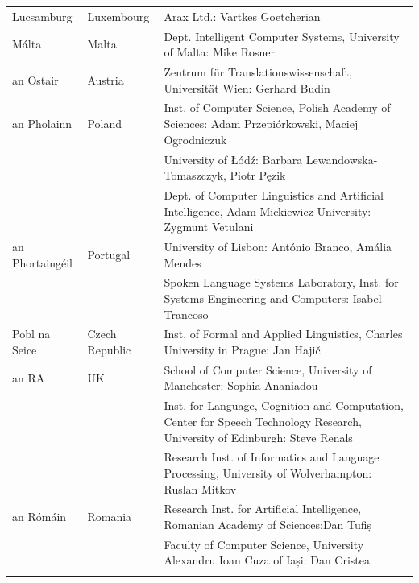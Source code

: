 \begin{longtable}{@{}llp{113mm}@{}}
  Lucsamburg & \textcolor{grey1}{Luxembourg} & Arax Ltd.: Vartkes Goetcherian\\ \addlinespace
  
  Málta & \textcolor{grey1}{Malta} & Dept. Intelligent Computer Systems, University of Malta: Mike Rosner\\ \addlinespace
  
  an Ostair & \textcolor{grey1}{Austria} & Zentrum für Translationswissenschaft, Universität Wien: Gerhard Budin\\ \addlinespace
   
  an Pholainn & \textcolor{grey1}{Poland} & Inst. of Computer Science, Polish Academy of Sciences: Adam Przepiórkowski, Maciej Ogrodniczuk \\ \addlinespace
  & & University of Łódź: Barbara Lewandowska-Tomaszczyk, Piotr Pęzik\\ \addlinespace
  & & Dept. of Computer Linguistics and Artificial Intelligence, Adam Mickiewicz University: Zygmunt Vetulani \\ \addlinespace
  
  an Phortaingéil & \textcolor{grey1}{Portugal} & University of Lisbon: António Branco, Amália Mendes \\ \addlinespace
  & & Spoken Language Systems Laboratory, Inst. for Systems Engineering and Computers: Isabel Trancoso \\ \addlinespace
  
  Pobl na Seice & \textcolor{grey1}{Czech Republic} & Inst. of Formal and Applied Linguistics, Charles University in Prague: Jan Hajič \\ \addlinespace
  
  an RA & \textcolor{grey1}{UK} &   School of Computer Science, University of Manchester: Sophia Ananiadou \\ \addlinespace 
  & & Inst. for Language, Cognition and Computation, Center for Speech Technology Research, University of Edinburgh: Steve Renals \\ \addlinespace 
  & & Research Inst. of Informatics and Language Processing, University of Wolverhampton: Ruslan Mitkov \\ \addlinespace
  
  an Rómáin & \textcolor{grey1}{Romania} & Research Inst. for Artificial Intelligence, Romanian Academy of Sciences:\newline Dan Tufiș \\ \addlinespace
  & & Faculty of Computer Science, University Alexandru Ioan Cuza of Iași: Dan Cristea \\ \addlinespace
  

\end{longtable}
